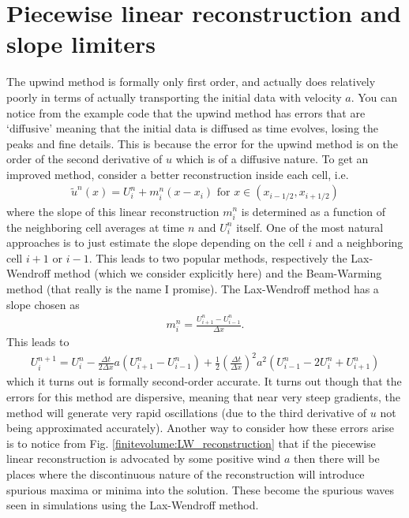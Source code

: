 \section*{Piecewise linear reconstruction and slope limiters}
The upwind method is formally only first order, and actually does relatively poorly in terms of actually transporting the initial data with velocity $a$.  You can notice from the example code that the upwind method has errors that are `diffusive' meaning that the initial data is diffused as time evolves, losing the peaks and fine details.  This is because the error for the upwind method is on the order of the second derivative of $u$ which is of a diffusive nature.  To get an improved method, consider a better reconstruction inside each cell, i.e.
\begin{gather}
\tilde{u}^n(x) = U_i^n + m_i^n(x-x_i) \mbox{ for } x \in (x_{i-1/2},x_{i+1/2})
\end{gather}
where the slope of this linear reconstruction $m_i^n$ is determined as a function of the neighboring cell averages at time $n$ and $U_i^n$ itself.  One of the most natural approaches is to just estimate the slope depending on the cell $i$ and a neighboring cell $i+1$ or $i-1$.  This leads to two popular methods, respectively the Lax-Wendroff method (which we consider explicitly here) and the Beam-Warming method (that really is the name I promise).  The Lax-Wendroff method has a slope chosen as
\begin{gather}
m_i^n = \frac{U^n_{i+1}-U_{i-1}^n}{\Delta x}.
\end{gather}
This leads to
\begin{gather}
U_i^{n+1} = U_i^n - \frac{\Delta t}{2\Delta x} a \left(U_{i+1}^n-U_{i-1}^n\right) + \frac{1}{2}\left(\frac{\Delta t}{\Delta x}\right)^2 a^2 \left(U_{i-1}^n - 2U_i^n+U_{i+1}^n\right)
\end{gather}
which it turns out is formally second-order accurate.  It turns out though that the errors for this method are dispersive, meaning that near very steep gradients, the method will generate very rapid oscillations (due to the third derivative of $u$ not being approximated accurately).  Another way to consider how these errors arise is to notice from Fig. \ref{finitevolume:LW_reconstruction} that if the piecewise linear reconstruction is advocated by some positive wind $a$ then there will be places where the discontinuous nature of the reconstruction will introduce spurious maxima or minima into the solution.  These become the spurious waves seen in simulations using the Lax-Wendroff method.


